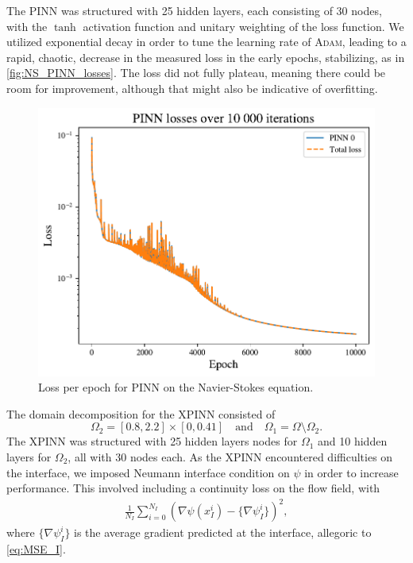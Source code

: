 The PINN was structured with 25 hidden layers, each consisting of 30 nodes, with the $\tanh$ activation function and unitary weighting of the loss function.
We utilized exponential decay in order to tune the learning rate of \textsc{Adam}, leading to a rapid, chaotic, decrease in the measured loss in the early epochs, stabilizing, as in \autoref{fig:NS_PINN_losses}.
The loss did not fully plateau, meaning there could be room for improvement, although that might also be indicative of overfitting.

\begin{figure}[th]
    \centering
    \includegraphics[width=\linewidth]{Project1XPINNs/figures/NavierStokes/NoDecomp/ND_10000_iter_30x25/losses/PINN_losses.pdf}
    \caption{Loss per epoch for PINN on the Navier-Stokes equation.}
    \label{fig:NS_PINN_losses}
\end{figure}

The domain decomposition for the XPINN consisted of
\begin{equation}
    \Omega_2 = [0.8, 2.2] \times [0, 0.41] \quad\text{and}\quad
    \Omega_1 = \Omega \setminus \Omega_2.
\end{equation}
The XPINN was structured with 25 hidden layers nodes for $\Omega_1$ and 10 hidden layers for $\Omega_2$, all with 30 nodes each.
As the XPINN encountered difficulties on the interface, we imposed Neumann interface condition on $\psi$ in order to increase performance.
This involved including a continuity loss on the flow field, with
\begin{align}
    \frac{1}{N_I} \sum_{i=0}^{N_I} \left( \nabla \psi(x_I^i) - \{ \nabla\psi_I^i \}  \right)^2,
\end{align}
where $\{\nabla\psi_I^i\}$ is the average gradient predicted at the interface, allegoric to \eqref{eq:MSE_I}.

